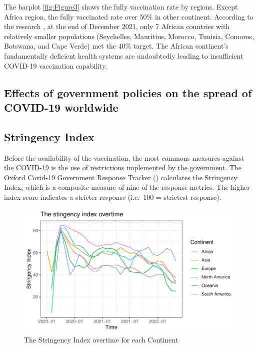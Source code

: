\documentclass[11pt,a4paper,]{article}
\begin{document}
The barplot \ref{fig:Figure3} shows the fully vaccination rate by regions. Except Africa region, the fully vaccinated rate over 50\% in other continent. According to the research \textcite{African-COVID-19-vaccination}, at the end of December 2021, only 7 African countries with relatively smaller populations (Seychelles, Mauritius, Morocco, Tunisia, Comoros, Botswana, and Cape Verde) met the 40\% target. The African continent's fundamentally deficient health systems are undoubtedly leading to insufficient COVID-19 vaccination capability.

\clearpage

\hypertarget{effects-of-government-policies-on-the-spread-of-covid-19-worldwide}{%
\subsection{\texorpdfstring{\textbf{Effects of government policies on the spread of COVID-19 worldwide}}{Effects of government policies on the spread of COVID-19 worldwide}}\label{effects-of-government-policies-on-the-spread-of-covid-19-worldwide}}

\subsection*{Stringency Index}

Before the availability of the vaccination, the most commons measures against the COVID-19 is the use of restrictions implemented by the government. The Oxford Covid-19 Government Response Tracker (\textcite{OxCGRT}) calculates the Stringency Index, which is a composite measure of nine of the response metrics. The higher index score indicates a stricter response (i.e.~100 = strictest response).

\begin{figure}

{\centering \includegraphics{report_files/figure-latex/stringency-index-1} 

}

\caption{The Stringency Index overtime for each Continent}\label{fig:stringency-index}
\end{figure}
\end{document}
